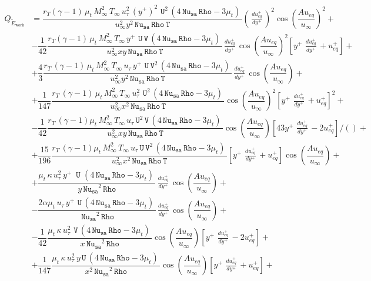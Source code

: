\documentclass[10pt]{article}
\newcommand{\Rho}{\,\mathtt{Rho}}
\newcommand{\U}{\,\mathtt{U}}
\newcommand{\V}{\,\mathtt{V}}
\newcommand{\Nu}{\,\mathtt{Nu_{sa}}}
\newcommand{\T}{\,\mathtt{T}}
\newcommand{\Dueqplusyplus}{\, \frac{du_{eq}^+}{dy^+}\,}
\newcommand{\tE}{\tilde{E}}
\begin{document}
\begin{equation*}
 \begin{split}
%
Q_{\tE_\text{work}}&=\dfrac{ r_T(\gamma-1) \,  \mu_t \, M_{\infty}^2 \, T_{\infty} \,  u_{\tau}^2 \, (y^{+})^2 \,  \U^2 \, (4 \Nu \Rho-3 \mu_t) \,}{u_{\infty}^2 y^2 \Nu \Rho \T}    \left(\Dueqplusyplus\right)^2  \cos\left(\dfrac{A u_{eq}}{u_{\infty}}\right)^2+\\
  &-\dfrac{1}{42} \dfrac{ r_T(\gamma-1) \,  \mu_t  \, M_{\infty}^2 \, T_{\infty} \,   y^{+} \, \U \V \, (4 \Nu \Rho-3 \mu_t) \, }{u_{\infty}^2 x y \Nu \Rho \T}  \Dueqplusyplus \cos\left(\dfrac{A u_{eq}}{u_{\infty}}\right)^2 \left[y^{+} \, \Dueqplusyplus+u_{eq}^{+} \right]+\\&
  +\dfrac{4}{3}\dfrac{ r_T \, (\gamma-1) \,  \mu_t \, M_{\infty}^2 \, T_{\infty} \,  u_{\tau} \, y^{+} \, \U \V^2 \, (4 \Nu \Rho-3 \mu_t) \,}{u_{\infty}^2 y^2 \Nu \Rho \T}  \Dueqplusyplus \cos\left(\dfrac{A u_{eq}}{u_{\infty}}\right)+\\
  &+\dfrac{1}{147} \dfrac{r_T \,  (\gamma-1) \,  \mu_t  \, M_{\infty}^2 \, T_{\infty} \,  u_{\tau}^2 \, \U^2 \, (4 \Nu \Rho-3 \mu_t) \,}{u_{\infty}^2 x^2 \Nu \Rho \T} \cos\left(\dfrac{A u_{eq}}{u_{\infty}}\right)^2\left[y^{+} \, \Dueqplusyplus+u_{eq}^{+} \right]^2+\\
  &-\dfrac{1}{42} \dfrac{ r_T \,  (\gamma-1)\mu_t \, M_{\infty}^2 \, T_{\infty} \,  u_{\tau} \U^2 \V\, (4 \Nu \Rho-3 \mu_t) \,}{u_{\infty}^2 x y \Nu \Rho \T} \cos\left(\dfrac{A u_{eq}}{u_{\infty}}\right)\left[43 y^{+} \, \Dueqplusyplus-2 u_{eq}^{+}\right]  /()+\\
  &+\dfrac{15}{196} \dfrac{r_T \, (\gamma-1)\mu_t \, M_{\infty}^2 \, T_{\infty} \,  u_{\tau} \U \V^2 \, (4 \Nu \Rho-3 \mu_t) \,}{u_{\infty}^2 x^2 \Nu \Rho \T}  \left[y^{+} \, \Dueqplusyplus+u_{eq}^{+} \right] \cos\left(\dfrac{A u_{eq}}{u_{\infty}}\right)+\\
  &+\dfrac{\mu_t \, \kappa \,   u_{\tau}^2 \, y^{+} \, \, \U \,\, (4 \Nu \Rho-3 \mu_t) \,}{y \Nu^2 \Rho} \Dueqplusyplus \cos\left(\dfrac{A u_{eq}}{u_{\infty}}\right)+\\
  &-\dfrac{2  \alpha \mu_t \,  u_{\tau} \,  y^{+} \, \U \, (4 \Nu \Rho-3 \mu_t) \,}{\Nu^2 \Rho} \Dueqplusyplus \cos\left(\dfrac{A u_{eq}}{u_{\infty}}\right)+\\
  &-\dfrac{1}{42} \dfrac{\mu_t \, \kappa \,  u_{\tau}^2 \, \V \, (4 \Nu \Rho-3 \mu_t) \,}{x \Nu^2 \Rho} \cos\left(\dfrac{A u_{eq}}{u_{\infty}}\right)\left[y^{+} \, \Dueqplusyplus-2 u_{eq}^{+}\right] +\\
  &+\dfrac{1}{147} \dfrac{   \mu_t \, \kappa \,  u_{\tau}^2 \, y \U \, (4 \Nu \Rho-3 \mu_t) \,}{x^2 \Nu^2 \Rho}\cos\left(\dfrac{A u_{eq}}{u_{\infty}}\right)\left[y^{+} \, \Dueqplusyplus+u_{eq}^{+} \right]+\\

\end{split}
\end{equation*}
\end{document}
